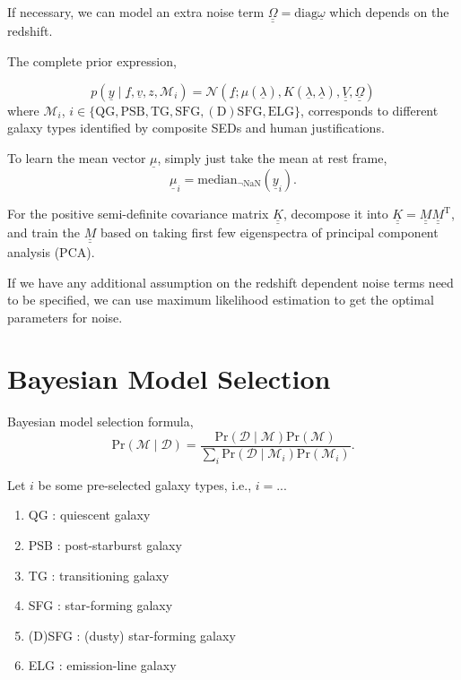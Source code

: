 \documentclass[12pt,letterpaper]{article}
\newcommand{\q}{\underline}
\newcommand{\mt}{\mathrm}
\begin{document}
If necessary, we can model an extra noise term $\q{\q \Omega} = \mt{diag}\q \omega$ which depends on the redshift.

The complete prior expression, 

\begin{equation}
    p(\q y \mid \q f, \q v, z, \mathcal{M}_i) = \mathcal{N}(\q f; \mu(\q \lambda), K(\q \lambda, \q \lambda), \q{\q V}, \q{\q \Omega})
\end{equation}
where $\mathcal{M}_i$, $ i \in { \mt{ \{QG, PSB, TG, SFG, (D)SFG, ELG\} } } $, 
corresponds to different galaxy types identified by 
composite SEDs and human justifications.

To learn the mean vector $\q \mu$, simply just take the mean at rest frame,
\begin{equation}
    \q \mu_i = \mt{median}_{\neg \mt{NaN}} (\q y_i).
\end{equation}

For the positive semi-definite covariance matrix $\q{\q K}$, 
decompose it into $\q{\q K} = \q{\q M} \q{\q M}^{\mt T}$, 
and train the $\q{\q M}$ based on taking first few eigenspectra of principal component analysis (PCA).

If we have any additional assumption on the redshift dependent noise terms need to be specified,
we can use maximum likelihood estimation to get the optimal parameters for noise.



\section*{Bayesian Model Selection}

Bayesian model selection formula,
\begin{equation*}
    \mt{Pr}(\mathcal{M} \mid \mathcal{D}) = 
    \frac{ 
        \mt{Pr}(\mathcal{D} \mid \mathcal{M})\mt{Pr}(\mathcal M)
        }{ 
        \sum_i \mt{Pr}(\mathcal{D} \mid \mathcal M_i) \mt{Pr}(\mathcal M_i) 
    }.
\end{equation*}

Let $i$ be some pre-selected galaxy types, i.e., $i = ...$
\begin{enumerate}
    \item QG     : quiescent galaxy
    \item PSB    : post-starburst galaxy
    \item TG     : transitioning galaxy 
    \item SFG    : star-forming galaxy
    \item (D)SFG : (dusty) star-forming galaxy
    \item ELG    : emission-line galaxy
\end{enumerate}
\end{document}
